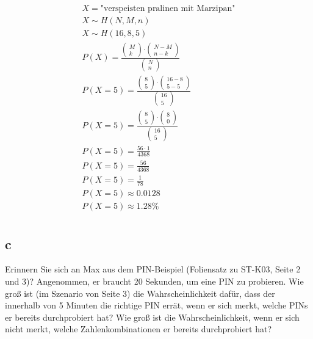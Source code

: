 \begin{align*}
    X = \text{"verspeisten pralinen mit Marzipan"} \\
    X \sim H\left(N, M, n\right) \\
    X \sim H\left(16,  8, 5\right) \\
    P(X) = \frac{\begin{pmatrix}
        M \\ k
    \end{pmatrix} \cdot \begin{pmatrix}
        N - M \\ n - k
    \end{pmatrix}}{\begin{pmatrix}
        N \\ n
    \end{pmatrix}} \\
    P(X = 5) = \frac{\begin{pmatrix}
        8 \\ 5
    \end{pmatrix} \cdot \begin{pmatrix}
        16 - 8 \\ 5 - 5
    \end{pmatrix}}{\begin{pmatrix}
        16 \\ 5
    \end{pmatrix}} \\
    P(X = 5) = \frac{\begin{pmatrix}
        8 \\ 5
    \end{pmatrix} \cdot \begin{pmatrix}
        8 \\ 0
    \end{pmatrix}}{\begin{pmatrix}
        16 \\ 5
    \end{pmatrix}} \\
    P(X = 5) = \frac{56\cdot 1}{4368} \\
    P(X = 5) = \frac{56}{4368} \\
    P(X = 5) = \frac{1}{78} \\
    P(X = 5) \approx 0.0128 \\
    P(X = 5) \approx 1.28\% \\
\end{align*}

\subsection{c}

Erinnern Sie sich an Max aus dem PIN-Beispiel (Foliensatz zu ST-K03, Seite 2 und 3)? Angenommen, er braucht 20 Sekunden, um eine PIN zu probieren. Wie groß ist (im Szenario von Seite 3) die Wahrscheinlichkeit dafür, dass der innerhalb von 5 Minuten die richtige PIN errät, wenn er sich merkt, welche PINs er bereits durchprobiert hat? Wie groß ist die Wahrscheinlichkeit, wenn er sich nicht merkt, welche Zahlenkombinationen er bereits durchprobiert hat?

